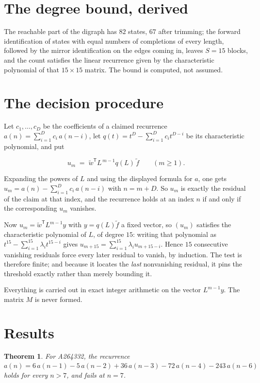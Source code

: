 \documentclass[11pt]{article}
\newtheorem{theorem}{Theorem}
\theoremstyle{definition}
\begin{document}
\section{The degree bound, derived}

The reachable part of the digraph has $82$ states, $67$ after trimming; the forward identification of states with equal numbers of completions of every length, followed by the mirror identification on the edges coming in, leaves $S = 15$ blocks, and the count satisfies the linear recurrence given by the characteristic polynomial of that $15\times15$ matrix. The bound is computed, not assumed.

\section{The decision procedure}

Let $c_1,\dots,c_D$ be the coefficients of a claimed recurrence $a(n) = \sum_{i=1}^{D} c_i\,a(n-i)$, let $q(t) = t^{D} - \sum_{i=1}^{D} c_i t^{D-i}$ be its characteristic polynomial, and put

\[u_m \;=\; \tilde w^{\mathsf T} L^{\,m-1} q(L)\,\tilde f \qquad (m \ge 1).\]

Expanding the powers of $L$ and using the displayed formula for $a$, one gets $u_m = a(n) - \sum_{i=1}^{D} c_i\,a(n-i)$ with $n = m + D$. So $u_m$ is exactly the residual of the claim at that index, and the recurrence holds at an index $n$ if and only if the corresponding $u_m$ vanishes.

Now $u_m = \tilde w^{\mathsf T} L^{m-1} y$ with $y = q(L)\tilde f$ a fixed vector, so $(u_m)$ satisfies the characteristic polynomial of $L$, of degree $15$: writing that polynomial as $t^{15} - \sum_{i=1}^{15} \lambda_i t^{15-i}$ gives $u_{m+15} = \sum_{i=1}^{15} \lambda_i u_{m+15-i}$. Hence $15$ consecutive vanishing residuals force every later residual to vanish, by induction. The test is therefore finite; and because it locates the {\itshape last} nonvanishing residual, it pins the threshold exactly rather than merely bounding it.

Everything is carried out in exact integer arithmetic on the vector $L^{m-1}y$. The matrix $M$ is never formed.

\section{Results}

\begin{theorem} For A264332, the recurrence $a(n) = 6\,a(n-1) - 5\,a(n-2) + 36\,a(n-3) - 72\,a(n-4) - 243\,a(n-6)$ holds for every $n > 7$, and fails at $n = 7$.\end{theorem}
\end{document}
